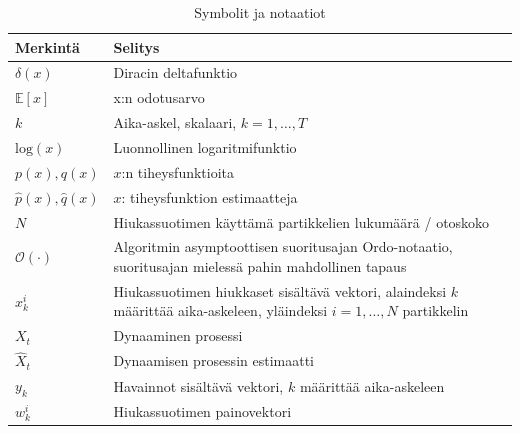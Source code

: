 \documentclass[
  12pt,
  a4paper, twoside]{book}
\begin{document}
\begin{table}

\caption{\label{tab:notaatiot}Symbolit ja notaatiot}
\centering
\begin{tabular}[t]{ll}
\toprule
Merkintä & Selitys\\
\midrule
$\delta(x)$ & Diracin deltafunktio\\
$\mathbb{E}[x]$ & x:n odotusarvo\\
$k$ & Aika-askel, skalaari, $k={1,\ldots,T}$\\
$\text{log}(x)$ & Luonnollinen logaritmifunktio\\
$p(x), q(x)$ & $x$:n tiheysfunktioita\\
\addlinespace
$\hat{p}(x), \hat{q}(x)$ & $x$: tiheysfunktion estimaatteja\\
$N$ & Hiukassuotimen käyttämä partikkelien lukumäärä / otoskoko\\
$\mathcal{O}(\cdot)$ & \makecell[l]{Algoritmin asymptoottisen suoritusajan Ordo-notaatio,\\suoritusajan mielessä pahin mahdollinen tapaus}\\
$x^i_k$ & \makecell[l]{Hiukassuotimen hiukkaset sisältävä vektori,\\alaindeksi $k$ määrittää aika-askeleen,\\yläindeksi $i={1,\ldots,N}$ partikkelin}\\
$X_t$ & Dynaaminen prosessi\\
\addlinespace
$\hat{X}_t$ & Dynaamisen prosessin estimaatti\\
$y_k$ & Havainnot sisältävä vektori, $k$ määrittää aika-askeleen\\
$w^i_k$ & Hiukassuotimen painovektori\\
\bottomrule
\end{tabular}
\end{table}
\end{document}
